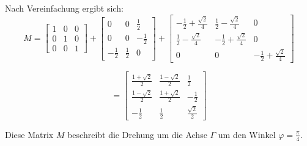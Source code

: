 Nach Vereinfachung ergibt sich:
\[
M = \begin{bmatrix}
1 & 0 & 0 \\
0 & 1 & 0 \\
0 & 0 & 1
\end{bmatrix} + \begin{bmatrix}
0 & 0 & \frac{1}{2} \\
0 & 0 & -\frac{1}{2} \\
-\frac{1}{2} & \frac{1}{2} & 0
\end{bmatrix} + \begin{bmatrix}
-\frac{1}{2} + \frac{\sqrt{2}}{4} & \frac{1}{2} - \frac{\sqrt{2}}{4} & 0 \\
\frac{1}{2} - \frac{\sqrt{2}}{4} & -\frac{1}{2} + \frac{\sqrt{2}}{4} & 0 \\
0 & 0 & -\frac{1}{2} + \frac{\sqrt{2}}{4}
\end{bmatrix}
\]

\[
= \begin{bmatrix}
\frac{1 + \sqrt{2}}{2} & \frac{1 - \sqrt{2}}{2} & \frac{1}{2} \\
\frac{1 - \sqrt{2}}{2} & \frac{1 + \sqrt{2}}{2} & -\frac{1}{2} \\
-\frac{1}{2} & \frac{1}{2} & \frac{\sqrt{2}}{2}
\end{bmatrix}
\]

Diese Matrix \( M \) beschreibt die Drehung um die Achse \(\Gamma\) um den Winkel \(\varphi = \frac{\pi}{4}\).

